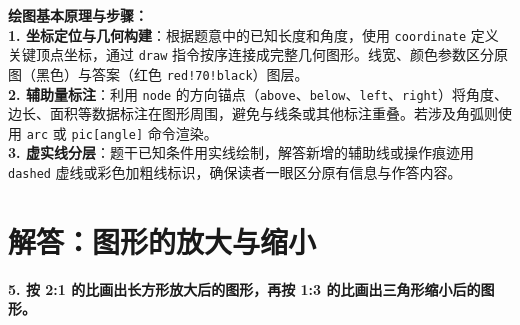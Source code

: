 \vspace{0.8cm}


\vspace{0.6cm}

{\small\color{blue!70!black}
\textbf{绘图基本原理与步骤：}\\
\textbf{1. 坐标定位与几何构建}：根据题意中的已知长度和角度，使用 \texttt{coordinate} 定义关键顶点坐标，通过 \texttt{draw} 指令按序连接成完整几何图形。线宽、颜色参数区分原图（黑色）与答案（红色 \texttt{red!70!black}）图层。\\
\textbf{2. 辅助量标注}：利用 \texttt{node} 的方向锚点（\texttt{above}、\texttt{below}、\texttt{left}、\texttt{right}）将角度、边长、面积等数据标注在图形周围，避免与线条或其他标注重叠。若涉及角弧则使用 \texttt{arc} 或 \texttt{pic[angle]} 命令渲染。\\
\textbf{3. 虚实线分层}：题干已知条件用实线绘制，解答新增的辅助线或操作痕迹用 \texttt{dashed} 虚线或彩色加粗线标识，确保读者一眼区分原有信息与作答内容。
}

\newpage




\section{解答：图形的放大与缩小}

\vspace{0.4cm}

\noindent\textbf{5. 按 2:1 的比画出长方形放大后的图形，再按 1:3 的比画出三角形缩小后的图形。}

\vspace{0.8cm}


